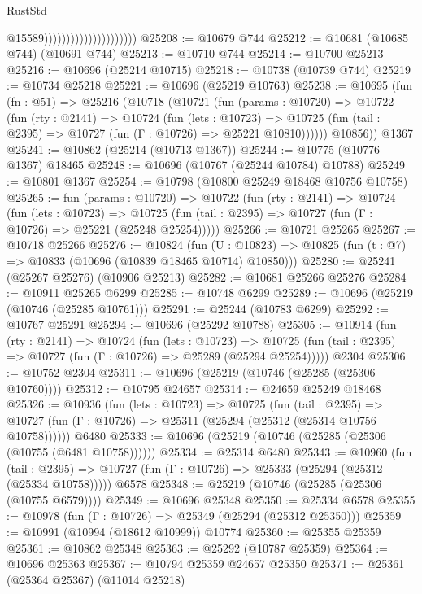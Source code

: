 \begin{lexlean}{RustStd}
\begin{coremodule}
                                              @15589)))))))))))))))))))))
@25208 := @10679 @744
@25212 := @10681 (@10685 @744) (@10691 @744)
@25213 := @10710 @744
@25214 := @10700 @25213
@25216 := @10696 (@25214 @10715)
@25218 := @10738 (@10739 @744)
@25219 := @10734 @25218
@25221 := @10696 (@25219 @10763)
@25238 := @10695
    (fun (fn : @51) =>
    @25216
      (@10718
        (@10721
          (fun (params : @10720) =>
          @10722
            (fun (rty : @2141) =>
            @10724
              (fun (lets : @10723) =>
              @10725 (fun (tail : @2395) => @10727 (fun (Γ : @10726) => @25221 @10810))))))
        @10856))
    @1367
@25241 := @10862 (@25214 (@10713 @1367))
@25244 := @10775 (@10776 @1367) @18465
@25248 := @10696 (@10767 (@25244 @10784) @10788)
@25249 := @10801 @1367
@25254 := @10798 (@10800 @25249 @18468 @10756 @10758)
@25265 := fun (params : @10720) =>
  @10722
    (fun (rty : @2141) =>
    @10724
      (fun (lets : @10723) =>
      @10725 (fun (tail : @2395) => @10727 (fun (Γ : @10726) => @25221 (@25248 @25254)))))
@25266 := @10721 @25265
@25267 := @10718 @25266
@25276 := @10824
    (fun (U : @10823) => @10825 (fun (t : @7) => @10833 (@10696 (@10839 @18465 @10714) @10850)))
@25280 := @25241 (@25267 @25276) (@10906 @25213)
@25282 := @10681 @25266 @25276
@25284 := @10911 @25265 @6299
@25285 := @10748 @6299
@25289 := @10696 (@25219 (@10746 (@25285 @10761)))
@25291 := @25244 (@10783 @6299)
@25292 := @10767 @25291
@25294 := @10696 (@25292 @10788)
@25305 := @10914
    (fun (rty : @2141) =>
    @10724
      (fun (lets : @10723) =>
      @10725 (fun (tail : @2395) => @10727 (fun (Γ : @10726) => @25289 (@25294 @25254)))))
    @2304
@25306 := @10752 @2304
@25311 := @10696 (@25219 (@10746 (@25285 (@25306 @10760))))
@25312 := @10795 @24657
@25314 := @24659 @25249 @18468
@25326 := @10936
    (fun (lets : @10723) =>
    @10725
      (fun (tail : @2395) =>
      @10727 (fun (Γ : @10726) => @25311 (@25294 (@25312 (@25314 @10756 @10758))))))
    @6480
@25333 := @10696 (@25219 (@10746 (@25285 (@25306 (@10755 (@6481 @10758))))))
@25334 := @25314 @6480
@25343 := @10960
    (fun (tail : @2395) => @10727 (fun (Γ : @10726) => @25333 (@25294 (@25312 (@25334 @10758)))))
    @6578
@25348 := @25219 (@10746 (@25285 (@25306 (@10755 @6579))))
@25349 := @10696 @25348
@25350 := @25334 @6578
@25355 := @10978 (fun (Γ : @10726) => @25349 (@25294 (@25312 @25350)))
@25359 := @10991 (@10994 (@18612 @10999)) @10774
@25360 := @25355 @25359
@25361 := @10862 @25348
@25363 := @25292 (@10787 @25359)
@25364 := @10696 @25363
@25367 := @10794 @25359 @24657 @25350
@25371 := @25361 (@25364 @25367) (@11014 @25218)

\end{coremodule}
\end{lexlean}

